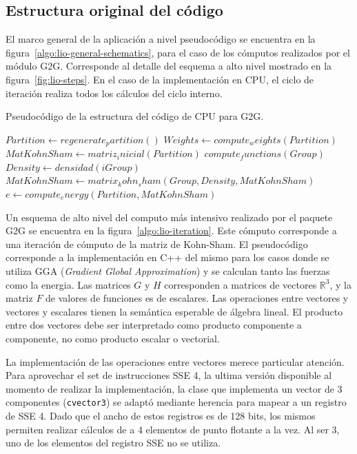 
\subsection{Estructura original del c\'odigo}

El marco general de la aplicaci\'on a nivel pseudoc\'odigo se encuentra en la
figura~\ref{algo:lio-general-schematics}, para el caso de los c\'omputos realizados
por el m\'odulo G2G. Corresponde al detalle del esquema
a alto nivel mostrado en la figura~\ref{fig:lio-steps}. En el caso de la
implementaci\'on en CPU, el ciclo de iteraci\'on realiza todos los c\'alculos del
ciclo interno.

\begin{algorithm}[hptb]
    \caption{Pseudoc\'odigo de la estructura del c\'odigo de CPU para G2G.}
    \label{algo:lio-general-schematics}
    \begin{algorithmic}
        \State $Partition \gets regenerate_partition()$
        \State $Weights \gets compute_weights(Partition)$
        \State $MatKohnSham \gets matriz_inicial(Partition)$
                \State $compute_functions(Group)$
                \State $Density \gets densidad(iGroup)$
                \State $MatKohnSham \gets matrix_kohn_sham(Group, Density, MatKohnSham)$
            \EndFor
        \EndWhile
        \State $e \gets compute_energy(Partition, MatKohnSham)$
    \end{algorithmic}
\end{algorithm}

Un esquema de alto nivel del computo m\'as intensivo realizado por el paquete
G2G se encuentra en la figura~\ref{algo:lio-iteration}. Este c\'omputo corresponde
a una iteraci\'on de c\'omputo de la matriz de Kohn-Sham. El pseudoc\'odigo
corresponde a la implementaci\'on en C++ del mismo para los casos donde se
utiliza GGA (\textit{Gradient Global Approximation}) y se calculan tanto las
fuerzas como la energia.
Las matrices $G$ y $H$ corresponden a matrices de vectores $\mathbb{R}^3$, y
la matriz $F$ de valores de funciones es de escalares. Las operaciones entre
vectores y vectores y escalares tienen la sem\'antica esperable de \'algebra
lineal. El producto entre dos vectores debe ser interpretado como producto
componente a componente, no como producto escalar o vectorial.

La implementaci\'on de las operaciones entre vectores merece particular atenci\'on.
Para aprovechar el set de instrucciones SSE 4, la ultima versi\'on disponible al
momento de realizar la implementaci\'on, la clase que implementa un vector de 3
componentes (\texttt{cvector3}) se adapt\'o mediante herencia para mapear a un
registro de SSE 4. Dado que el ancho de estos registros es de 128 bits, los mismos
permiten realizar c\'alculos de a 4 elementos de punto flotante a la vez. Al ser 3, uno de los
elementos del registro SSE no se utiliza.

